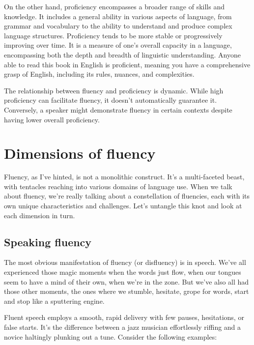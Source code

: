 On the other hand, proficiency encompasses a broader range of skills and knowledge. It includes a general ability in various aspects of language, from grammar and vocabulary to the ability to understand and produce complex language structures. Proficiency tends to be more stable or progressively improving over time. It is a measure of one's overall capacity in a language, encompassing both the depth and breadth of linguistic understanding. Anyone able to read this book in English is proficient, meaning you have a comprehensive grasp of English, including its rules, nuances, and complexities.

The relationship between fluency and proficiency is dynamic. While high proficiency can facilitate fluency, it doesn't automatically guarantee it. Conversely, a speaker might demonstrate fluency in certain contexts despite having lower overall proficiency.

\section{Dimensions of fluency}

Fluency, as I've hinted, is not a monolithic construct. It's a multi-faceted beast, with tentacles reaching into various domains of language use. When we talk about fluency, we're really talking about a constellation of fluencies, each with its own unique characteristics and challenges. Let's untangle this knot and look at each dimension in turn.

\subsection{Speaking fluency}

The most obvious manifestation of fluency (or disfluency) is in speech. We've all experienced those magic moments when the words just flow, when our tongues seem to have a mind of their own, when we're in the zone. But we've also all had those other moments, the ones where we stumble, hesitate, grope for words, start and stop like a sputtering engine.

Fluent speech employs a smooth, rapid delivery with few pauses, hesitations, or false starts. It's the difference between a jazz musician effortlessly riffing and a novice haltingly plunking out a tune. Consider the following examples:

